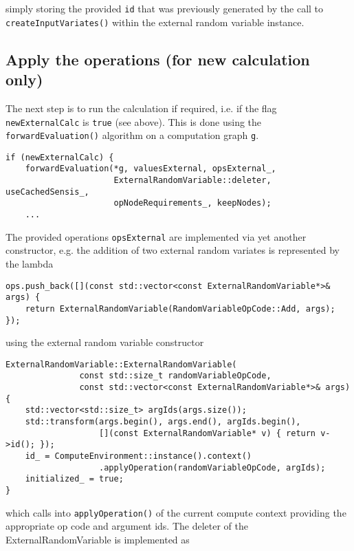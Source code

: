 \documentclass[12pt, a4paper]{article}
\begin{document}
simply storing the provided \verb+id+ that was previously generated by the call to \verb+createInputVariates()+ within
the external random variable instance.

\subsection{Apply the operations (for new calculation only)}

The next step is to run the calculation if required, i.e. if the flag \verb+newExternalCalc+ is \verb+true+ (see
above). This is done using the \verb+forwardEvaluation()+ algorithm on a computation graph \verb+g+.

\begin{verbatim}
if (newExternalCalc) {
    forwardEvaluation(*g, valuesExternal, opsExternal_,
                      ExternalRandomVariable::deleter, useCachedSensis_,
                      opNodeRequirements_, keepNodes);
    ...
\end{verbatim}

The provided operations \verb+opsExternal+ are implemented via yet another constructor, e.g. the addition of two
external random variates is represented by the lambda

\begin{verbatim}
ops.push_back([](const std::vector<const ExternalRandomVariable*>& args) {
    return ExternalRandomVariable(RandomVariableOpCode::Add, args);
});
\end{verbatim}

using the external random variable constructor

\begin{verbatim}
ExternalRandomVariable::ExternalRandomVariable(
               const std::size_t randomVariableOpCode,
               const std::vector<const ExternalRandomVariable*>& args) {
    std::vector<std::size_t> argIds(args.size());
    std::transform(args.begin(), args.end(), argIds.begin(),
                   [](const ExternalRandomVariable* v) { return v->id(); });
    id_ = ComputeEnvironment::instance().context()
                   .applyOperation(randomVariableOpCode, argIds);
    initialized_ = true;
}
\end{verbatim}

which calls into \verb+applyOperation()+ of the current compute context providing the appropriate op code and argument
ids. The deleter of the ExternalRandomVariable is implemented as
\end{document}
